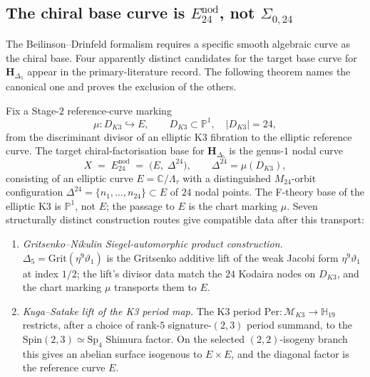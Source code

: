 \subsection{The chiral base curve is \texorpdfstring{$E^{\mathrm{nod}}_{24}$}{E-nod-24}, not \texorpdfstring{$\Sigma_{0,24}$}{Sigma-0,24}}
\label{subsec:k3-curve-base}

The Beilinson--Drinfeld formalism requires a specific smooth algebraic
curve as the chiral base. Four apparently distinct candidates for the
target base curve for $\mathbf{H}_{\Delta_5}$ appear in the primary-literature
record. The following theorem names the canonical one and proves the
exclusion of the others.

\begin{conjecture}
\label{thm:k3-seven-route-named-curve}
\ClaimStatusConjectured
Fix a Stage-$2$ reference-curve marking
\[
 \mu\colon D_{K3}\hookrightarrow E,
 \qquad
 D_{K3}\subset\mathbb P^1,\quad |D_{K3}|=24,
\]
from the discriminant divisor of an elliptic K3 fibration to the elliptic reference curve. The target chiral-factorisation base for $\mathbf{H}_{\Delta_5}$ is the
genus-$1$ nodal curve
\[
 X \;=\; E^{\mathrm{nod}}_{24}
 \;=\; \bigl(E,\; \Delta^{24}\bigr),
 \qquad
 \Delta^{24}=\mu(D_{K3}),
\]
consisting of an elliptic curve $E=\mathbb{C}/\Lambda_\tau$ with a
distinguished $M_{24}$-orbit configuration $\Delta^{24} =
\{n_1,\ldots,n_{24}\}\subset E$ of $24$ nodal points. The F-theory base of the elliptic K3 is \(\mathbb P^1\), not \(E\); the passage to \(E\) is the chart marking \(\mu\). Seven structurally distinct construction routes give compatible data after this transport:
\begin{enumerate}[label=\textup{(R\arabic*)}, leftmargin=2.6em]
\item \emph{Gritsenko--Nikulin Siegel-automorphic product
 construction.} $\Delta_5 = \mathrm{Grit}(\eta^9\vartheta_1)$ is the
 Gritsenko additive lift of the weak Jacobi form $\eta^9\vartheta_1$
 at index $1/2$; the lift's divisor data match the \(24\) Kodaira nodes on \(D_{K3}\), and the chart marking \(\mu\) transports them to \(E\).
\item \emph{Kuga--Satake lift of the K3 period map.} The K3 period
 $\mathrm{Per}\colon\mathcal{M}_{K3}\to\mathbb{H}_{19}$ restricts, after a choice of rank-\(5\) signature-\((2,3)\) period summand, to the \(\mathrm{Spin}(2,3)\simeq \mathrm{Sp}_4\) Shimura factor. On the selected \((2,2)\)-isogeny branch this gives an abelian surface isogenous to \(E\times E\), and the diagonal factor is the reference curve \(E\).

\end{enumerate}
\end{conjecture}

